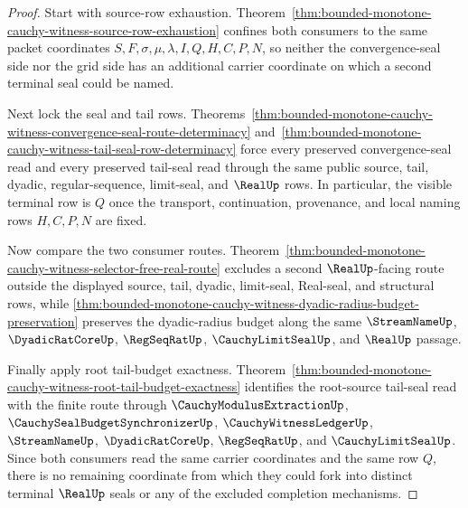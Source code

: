 \begin{proof}
Start with source-row exhaustion. Theorem~\ref{thm:bounded-monotone-cauchy-witness-source-row-exhaustion} confines both consumers to the same packet coordinates $S,F,\sigma,\mu,\lambda,I,Q,H,C,P,N$, so neither the convergence-seal side nor the grid side has an additional carrier coordinate on which a second terminal seal could be named.

Next lock the seal and tail rows. Theorems~\ref{thm:bounded-monotone-cauchy-witness-convergence-seal-route-determinacy} and~\ref{thm:bounded-monotone-cauchy-witness-tail-seal-row-determinacy} force every preserved convergence-seal read and every preserved tail-seal read through the same public source, tail, dyadic, regular-sequence, limit-seal, and $\RealUp$ rows. In particular, the visible terminal row is $Q$ once the transport, continuation, provenance, and local naming rows $H,C,P,N$ are fixed.

Now compare the two consumer routes. Theorem~\ref{thm:bounded-monotone-cauchy-witness-selector-free-real-route} excludes a second $\RealUp$-facing route outside the displayed source, tail, dyadic, limit-seal, Real-seal, and structural rows, while \autoref{thm:bounded-monotone-cauchy-witness-dyadic-radius-budget-preservation} preserves the dyadic-radius budget along the same $\StreamNameUp$, $\DyadicRatCoreUp$, $\RegSeqRatUp$, $\CauchyLimitSealUp$, and $\RealUp$ passage.

Finally apply root tail-budget exactness. Theorem~\ref{thm:bounded-monotone-cauchy-witness-root-tail-budget-exactness} identifies the root-source tail-seal read with the finite route through $\CauchyModulusExtractionUp$, $\CauchySealBudgetSynchronizerUp$, $\CauchyWitnessLedgerUp$, $\StreamNameUp$, $\DyadicRatCoreUp$, $\RegSeqRatUp$, and $\CauchyLimitSealUp$. Since both consumers read the same carrier coordinates and the same row $Q$, there is no remaining coordinate from which they could fork into distinct terminal $\RealUp$ seals or any of the excluded completion mechanisms.
\end{proof}

